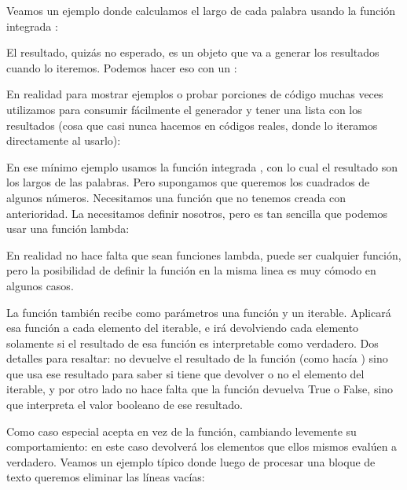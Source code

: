 Veamos un ejemplo donde calculamos el largo de cada palabra usando la función integrada :


El resultado, quizás no esperado, es un objeto  que va a generar los resultados cuando lo iteremos. Podemos hacer eso con un :


En realidad para mostrar ejemplos o probar porciones de código muchas veces utilizamos  para consumir fácilmente el generador y tener una lista con los resultados (cosa que casi nunca hacemos en códigos reales, donde lo iteramos directamente al usarlo):


En ese mínimo ejemplo usamos la función integrada , con lo cual el resultado son los largos de las palabras. Pero supongamos que queremos los cuadrados de algunos números. Necesitamos una función que no tenemos creada con anterioridad. La necesitamos definir nosotros, pero es tan sencilla que podemos usar una función lambda:


En realidad no hace falta que sean funciones lambda, puede ser cualquier función, pero la posibilidad de definir la función en la misma linea es muy cómodo en algunos casos.

La función  también recibe como parámetros una función y un iterable. Aplicará esa función a cada elemento del iterable, e irá devolviendo cada elemento solamente si el resultado de esa función es interpretable como verdadero. Dos detalles para resaltar: no devuelve el resultado de la función (como hacía ) sino que usa ese resultado para saber si tiene que devolver o no el elemento del iterable, y por otro lado no hace falta que la función devuelva True o False, sino que interpreta el valor booleano de ese resultado.


Como caso especial  acepta  en vez de la función, cambiando levemente su comportamiento: en este caso devolverá los elementos que ellos mismos evalúen a verdadero. Veamos un ejemplo típico donde luego de procesar una bloque de texto queremos eliminar las líneas vacías:

